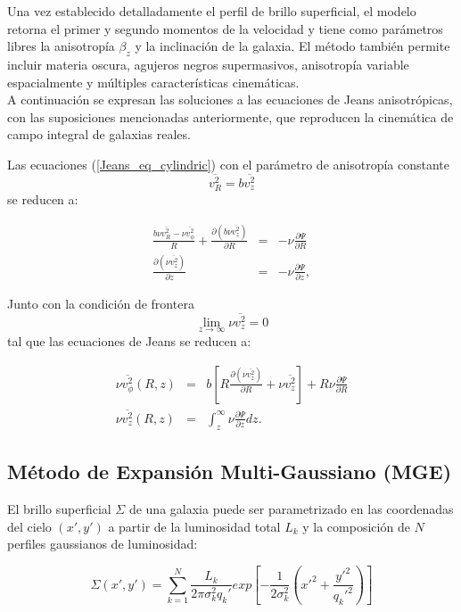 Una vez establecido detalladamente el perfil de brillo superficial, el modelo retorna el primer y segundo momentos de la velocidad y tiene como parámetros libres la anisotropía $\beta_z$ y la inclinación de la galaxia. El método también permite incluir materia oscura, agujeros negros supermasivos, anisotropía variable espacialmente y múltiples características cinemáticas.\\

A continuación se expresan las soluciones a las ecuaciones de Jeans anisotrópicas, con las suposiciones mencionadas anteriormente, que reproducen la cinemática de campo integral de galaxias reales.


Las ecuaciones (\ref{Jeans_eq_cylindric}) con el parámetro de anisotropía constante 
$$ \overline{v_R^2} = b\overline{v_z^2} $$
se reducen a:

\begin{eqnarray}
\frac{ b \nu \overline{v_R^2} - \nu \overline{v_{\phi}^2} }{R } + \frac{\partial (b \nu \overline{v_z^2})}{\partial R}  &=& -\nu \frac{\partial \Psi}{\partial R} \\
\frac{\partial (\nu \overline{v_z^2})}{\partial z}  &=& -\nu \frac{\partial \Psi}{\partial z},
\end{eqnarray}

Junto con la condición de frontera 
$$ \lim_{z\to\infty} \nu \overline{v_z^2} = 0 $$
tal que las ecuaciones de Jeans se reducen a:

\begin{eqnarray}
\label{Jeans_equation_phi}
\nu \overline{v_{\phi}^2}(R,z) &=& b \left [ R
\frac{\partial ( \nu \overline{v_z^2})}{\partial R} + \nu \overline{v_{z}^2} \right ] + R\nu \frac{\partial \Psi}{\partial R} \\
\label{Jeans_equation_z}
\nu \overline{v_z^2}(R,z)  &=& \int_z^{\infty} \nu \frac{\partial \Psi}{\partial z} dz.
\end{eqnarray}

\subsection{Método de Expansión Multi-Gaussiano (MGE)}

El brillo superficial $\Sigma$ de una galaxia puede ser parametrizado en las coordenadas del cielo $(x', y')$ a partir de la luminosidad total $L_k$ y la composición de $N$ perfiles gaussianos de luminosidad:

\begin{equation}
\label{surface_bright_cart}
\Sigma(x', y') = \sum_{k=1}^{N} \frac{L_k}{2\pi \sigma_k^2 q_k'} exp \left[ -\frac{1}{2\sigma_k^2} \left( x'^2 + \frac{y'^2}{q_k'^2} \right) \right ]
\end{equation}

